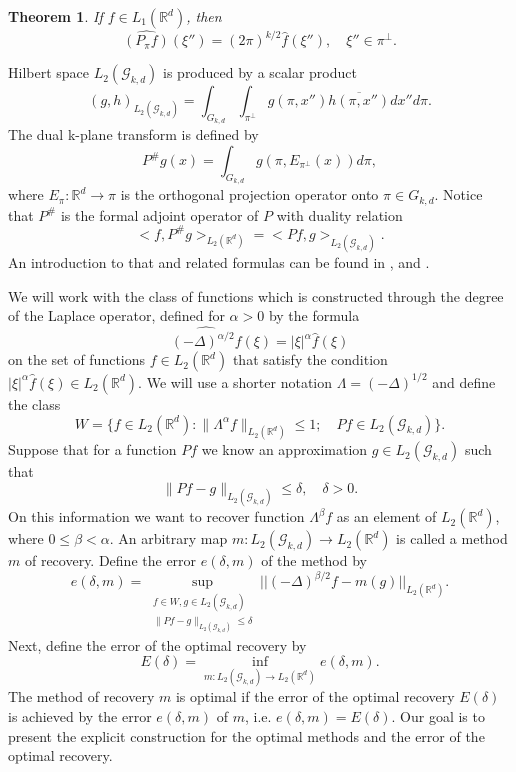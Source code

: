 \documentclass[12pt]{iopart}
\newtheorem{theorem}{Theorem}
\begin{document}
	\begin{theorem}
		\label{projection}
		If $f\in L_1(\mathbb R^d)$, then
		$$\widehat{(P_\pi f)}(\xi'')=(2\pi)^{k/2}\widehat f(\xi''),\quad \xi''\in\pi^\perp.$$
	\end{theorem}
Hilbert space $L_2(\mathcal G_{k,d})$ is produced by a scalar product	
	$$(g,h)_{L_2(\mathcal G_{k,d})}=\int_{G_{k,d}}\int_{\pi^\perp}g(\pi,x'')\overline{h(\pi,x'')}dx''d\pi.$$
The dual k-plane transform is defined by
	$$P^\#g(x) = \int_{G_{k,d}}g(\pi,E_{\pi^\perp}(x))d\pi,$$
where $E_\pi:\mathbb R^d\rightarrow\pi$ is the orthogonal projection operator onto $\pi\in G_{k,d}$.
Notice that $P^\#$ is the formal adjoint operator of $P$ with duality relation
	\begin{equation}
	\label{duality}
	<f,P^\#g>_{L_2(\mathbb R^d)} = <Pf,g>_{L_2(\mathcal G_{k,d})}.
	\end{equation}
An introduction to that and related formulas can be found in \cite{H},\cite{K} and \cite{MA}.

We will work with the class of functions which is constructed through the degree of the Laplace operator, defined for $\alpha> 0$ by the formula 
	$$\widehat{(-\Delta)^{\alpha/2}f}(\xi)=|\xi|^\alpha \widehat f(\xi)$$ on the set of functions $f\in L_2(\mathbb R^d)$ that satisfy the condition $|\xi|^\alpha\widehat f(\xi)\in L_2(\mathbb R^d)$.
We will use a shorter notation $\Lambda=(-\Delta)^{1/2}$ and define the class 
	$$ W=\{f\in L_2(\mathbb R^d) :
	\|\Lambda^\alpha f\|_{L_2(\mathbb R^d)}\leqslant  1;\quad Pf\in L_2(\mathcal G_{k,d}) \}.  $$
Suppose that for a function $Pf$ we know an approximation $g\in L_2(\mathcal G_{k,d})$ such that
	$$\|Pf-g\|_{L_2(\mathcal G_{k,d})}\leqslant\delta, \quad\delta>0.$$
On this information we want to recover function $\Lambda^\beta f$ as an element of $ L_2(\mathbb R^d)$, where $0\leqslant\beta<\alpha$. An arbitrary map $m:L_2(\mathcal G_{k,d})\rightarrow L_2(\mathbb R^d)$ is called a method $m$ of recovery. Define the error $e(\delta,m)$ of the method by
\[
  e(\delta,m)=\sup_{
  \begin{smallmatrix}
f\in W, g\in L_2(\mathcal G_{k,d})\\ 
\|Pf-g\|_{L_2(\mathcal G_{k,d})}\leqslant \delta
\end{smallmatrix}} ||(-\Delta)^{\beta/2}f-m(g)||_{L_2(\mathbb R^d)}.
\] 
Next, define the error of the optimal recovery by
\begin{equation}
\label{opter}
E(\delta)=\inf_{m:L_2(\mathcal G_{k,d})\rightarrow L_2(\mathbb R^d)}e(\delta,m).
\end{equation}
The method of recovery $m$ is optimal if the error of the optimal recovery $E(\delta)$ is achieved by the error $e(\delta,m)$ of $m$, i.e. $e(\delta,m)=E(\delta)$. Our goal is to present the explicit construction for the optimal methods and the error of the optimal recovery.
\end{document}
